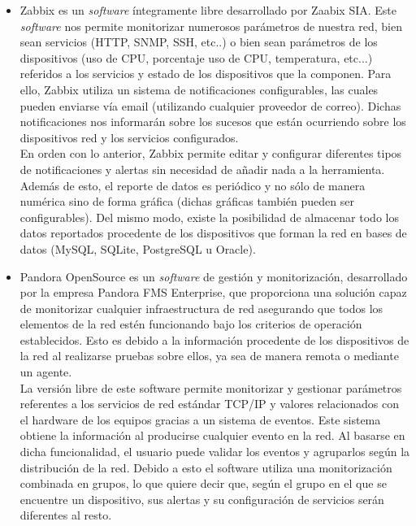 \begin{itemize}
		\item Zabbix \cite{Zabbix} es un \textit{software} íntegramente libre desarrollado por Zaabix SIA. Este \textit{software} nos permite monitorizar numerosos parámetros de nuestra red, bien sean servicios (HTTP, SNMP, SSH, etc..) o bien sean parámetros de los dispositivos (uso de CPU, porcentaje uso de CPU, temperatura, etc...) referidos a los servicios y estado de los dispositivos que la componen. Para ello, Zabbix utiliza un sistema de notificaciones configurables, las cuales pueden enviarse vía email (utilizando cualquier proveedor de correo). Dichas notificaciones nos informarán sobre los sucesos que están ocurriendo sobre los dispositivos red y los servicios configurados.\\
		En orden con lo anterior, Zabbix permite editar y configurar diferentes tipos de notificaciones y alertas sin necesidad de añadir nada a la herramienta. Además de esto, el reporte de datos es periódico y no sólo de manera numérica sino de forma gráfica (dichas gráficas también pueden ser configurables). Del mismo modo, existe la posibilidad de almacenar todo los datos reportados procedente de los dispositivos que forman la red en bases de datos (MySQL, SQLite, PostgreSQL u Oracle).
		
		\item Pandora OpenSource \cite{Pandora} es un \textit{software} de gestión y monitorización, desarrollado por la empresa Pandora FMS Enterprise, que proporciona una solución capaz de monitorizar cualquier infraestructura de red asegurando que todos los elementos de la red estén funcionando bajo los criterios de operación establecidos. Esto es debido a la información procedente de los dispositivos de la red al realizarse pruebas sobre ellos, ya sea de manera remota o mediante un agente. \\
		La versión libre de este software permite monitorizar y gestionar parámetros referentes a los servicios de red estándar TCP/IP y valores relacionados con el hardware de los equipos gracias a un sistema de eventos. Este sistema obtiene la información al producirse cualquier evento en la red. Al basarse en dicha funcionalidad, el usuario puede validar los eventos y agruparlos según la distribución de la red. Debido a esto el software utiliza una monitorización combinada en grupos, lo que quiere decir que, según el grupo en el que se encuentre un dispositivo, sus alertas y su configuración de servicios serán diferentes al resto.\\
	\end{itemize}
	
